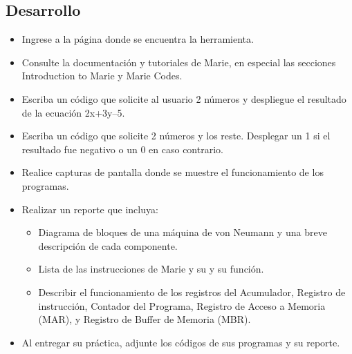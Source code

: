 \documentclass[12pt]{article}
\begin{document}
\subsection*{Desarrollo}
\label{sec:orgf14d666}
\begin{itemize}
\item Ingrese a la página donde se encuentra la herramienta.

\item Consulte la documentación y tutoriales de Marie, en especial las secciones Introduction to Marie y Marie Codes.

\item Escriba un código que solicite al usuario 2 números y despliegue el resultado de la ecuación 2x+3y–5.

\item Escriba un código que solicite 2 números y los reste. Desplegar un 1 si el resultado fue negativo o un 0 en caso contrario.

\item Realice capturas de pantalla donde se muestre el funcionamiento de los programas.

\item Realizar un reporte que incluya: 
\begin{itemize}
\item Diagrama de bloques de una máquina de von Neumann y una breve descripción de cada componente.

\item Lista de las instrucciones de Marie y su y su función.

\item Describir el funcionamiento de los registros del Acumulador, Registro de instrucción, Contador del Programa, Registro de Acceso a Memoria (MAR), y Registro de Buffer de Memoria (MBR).
\end{itemize}

\item Al entregar su práctica, adjunte los códigos de sus programas y su reporte.
\end{itemize}
\end{document}
